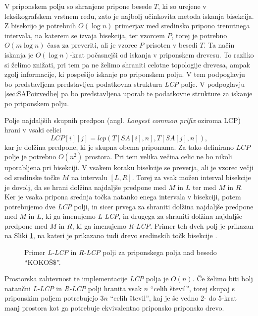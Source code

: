 V priponskem polju so shranjene pripone besede $T$, ki so urejene v leksikografskem vrstnem redu, zato je najbolj učinkovita metoda iskanja bisekcija. Z bisekcijo je potrebnih $O(\log{n})$ primerjav med sredinsko pripono trenutnega intervala, na katerem se izvaja bisekcija, ter vzorcem $P$, torej je potrebno $O(m\log{n})$ časa za preveriti, ali je vzorec $P$ prisoten v besedi $T$. Ta način iskanja je $O(\log{n})$-krat počasnejši od iskanja v priponskem drevesu. To razliko si želimo znižati, pri tem pa ne želimo shraniti celotne topologije drevesa, ampak zgolj informacije, ki pospešijo iskanje po priponskem polju. V tem podpoglavju bo predstavljena predstavljen podatkovna struktura \textit{LCP} polje. V podpoglavju \ref{sec:SAPoizvedbe} pa bo predstavljena uporab te podatkovne strukture za iskanje po priponskem polju.

Polje najdaljših skupnih predpon (angl. \textit{Longest common prifix} oziroma LCP) hrani v vsaki celici 
    $$\textit{LCP}[i][j]=lcp(T[SA[i],n],T[SA[j],n]),$$
kar je dolžina predpone, ki je skupna obema priponama. Za tako definirano $LCP$ polje je potrebno $O(n^2)$ prostora. Pri tem velika večina celic ne bo nikoli uporabljena pri bisekciji. V vsakem koraku bisekcije se preverja, ali je vzorec večji od sredinske točke $M$ na intervalu $[L,R]$. Torej za vsak možen interval bisekcije je dovolj, da se hrani dolžina najdaljše predpone med $M$ in $L$ ter med $M$ in $R$. Ker je vsaka pripona srednja točka natanko enega intervala v bisekciji, potem potrebujemo dve \textit{LCP} polji, in sicer prvega za shraniti dolžina najdaljše predpone med $M$ in $L$, ki ga imenujemo \textit{L-LCP}, in drugega za shraniti dolžina najdaljše predpone med $M$ in $R$, ki ga imenujemo \textit{R-LCP}. Primer teh dveh polj je prikazan na Sliki \ref{fig:RlcpLlcpSuffuxArray}, na kateri je prikazano tudi drevo sredinskih točk bisekcije \cite{Manber1990}. 

\begin{figure}[htb] 
    
    \centering
    \caption{Primer \textit{L-LCP} in \textit{R-LCP} polji za priponskega polja nad besedo \enquote{KOKOŠ$\$$}.} 
    \label{fig:RlcpLlcpSuffuxArray}
\end{figure}

Prostorska zahtevnost te implementacije \textit{LCP} polja je $O(n)$. Če želimo biti bolj natančni \textit{L-LCP} in \textit{R-LCP} polji hranita vsak $n$ \enquote{celih števil}, torej skupaj s priponskim poljem potrebujejo $3n$ \enquote{celih števil}, kaj je še vedno $2$- do $5$-krat manj prostora kot ga potrebuje ekvivalentno priponsko priponsko drevo.

